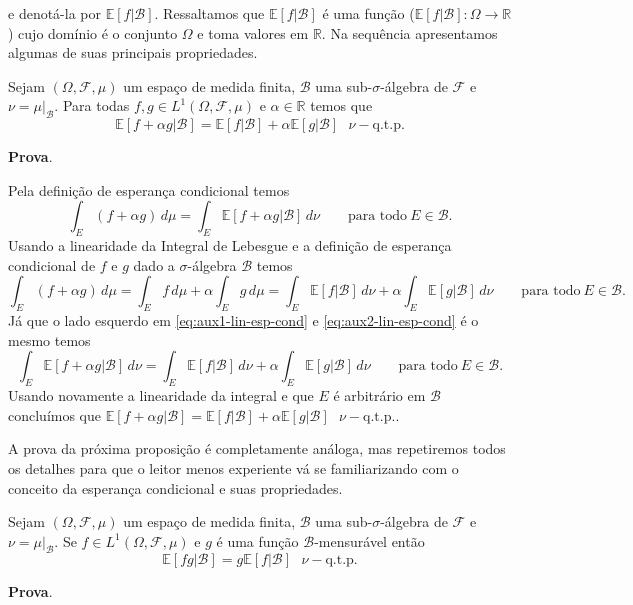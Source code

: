 e denotá-la por $\mathbb{E}[f|\mathcal{B}]$. Ressaltamos que $\mathbb{E}[f|\mathcal{B}]$ é uma função ($\mathbb{E}[f|\mathcal{B}]:\Omega\to\mathbb{R}$) cujo domínio é o conjunto $\Omega$ 
e toma valores em $\mathbb{R}$. Na sequência apresentamos algumas de suas principais propriedades.
\begin{proposicao}
	\label{teo:linearidade-esperanca-condicional}
Sejam $(\Omega,\mathcal{F},\mu)$ um espaço de medida finita, $\mathcal{B}$ uma sub-$\sigma$-álgebra de $\mathcal{F}$ e $\nu=\mu|_{\mathcal{B}}$. 
Para todas $f,g\in L^1(\Omega,\mathcal{F},\mu)$ e $\alpha\in\mathbb{R}$ temos que 
$$
\mathbb{E}[f+\alpha g|\mathcal{B}]=\mathbb{E}[f|\mathcal{B}]+\alpha\mathbb{E}[g|\mathcal{B}] \ \ \ \nu-\text{q.t.p.}
$$
\end{proposicao}
\textbf{Prova}. 

Pela definição de esperança condicional temos 
\begin{equation}\label{eq:aux1-lin-esp-cond}
\int_{E} (f+\alpha g)\, d\mu=
\int_{E} \mathbb{E}[f+\alpha g|\mathcal{B}]\, d\nu \qquad \text{para todo} \ E\in\mathcal{B}.
\end{equation}
Usando a linearidade da Integral de Lebesgue e a definição de esperança condicional de $f$ e $g$ dado a $\sigma$-álgebra
$\mathcal{B}$ temos
\begin{equation}
\label{eq:aux2-lin-esp-cond}
\int_{E} (f+\alpha g)\, d\mu=\int_{E} f\, d\mu+\alpha\int_{E} g\, d\mu=
\int_{E} \mathbb{E}[f|\mathcal{B}]\, d\nu +
\alpha\int_{E} \mathbb{E}[g|\mathcal{B}]\, d\nu
\qquad \text{para todo} \ E\in\mathcal{B}.
\end{equation}
Já que o lado esquerdo em \eqref{eq:aux1-lin-esp-cond} e \eqref{eq:aux2-lin-esp-cond} é o mesmo temos  
$$
\int_{E} \mathbb{E}[f+\alpha g|\mathcal{B}]\, d\nu
=
\int_{E} \mathbb{E}[f|\mathcal{B}]\, d\nu +
\alpha\int_{E} \mathbb{E}[g|\mathcal{B}]\, d\nu
\qquad \text{para todo} \ E\in\mathcal{B}.
$$
Usando novamente a linearidade da integral e que $E$ é arbitrário em $\mathcal{B}$ concluímos que
$\mathbb{E}[f+\alpha g|\mathcal{B}]=\mathbb{E}[f|\mathcal{B}]+\alpha\mathbb{E}[g|\mathcal{B}] \ \ \ \nu-\text{q.t.p.}$.
\bigskip


A prova da próxima proposição é completamente análoga, mas repetiremos todos os detalhes 
para que o leitor menos experiente vá se familiarizando com o conceito da esperança condicional e suas propriedades.
\begin{proposicao}
	\label{teo:propriedades-esperanca-condicional}
Sejam $(\Omega,\mathcal{F},\mu)$ um espaço de medida finita, $\mathcal{B}$ uma sub-$\sigma$-álgebra de $\mathcal{F}$ e $\nu=\mu|_{\mathcal{B}}$. 
Se $f\in L^1(\Omega,\mathcal{F},\mu)$ e $g$ é uma função $\mathcal{B}$-mensurável então 
$$
\mathbb{E}[f g|\mathcal{B}]=g\mathbb{E}[f|\mathcal{B}] \ \ \ \nu-\text{q.t.p.}
$$
\end{proposicao}
\textbf{Prova}. 

